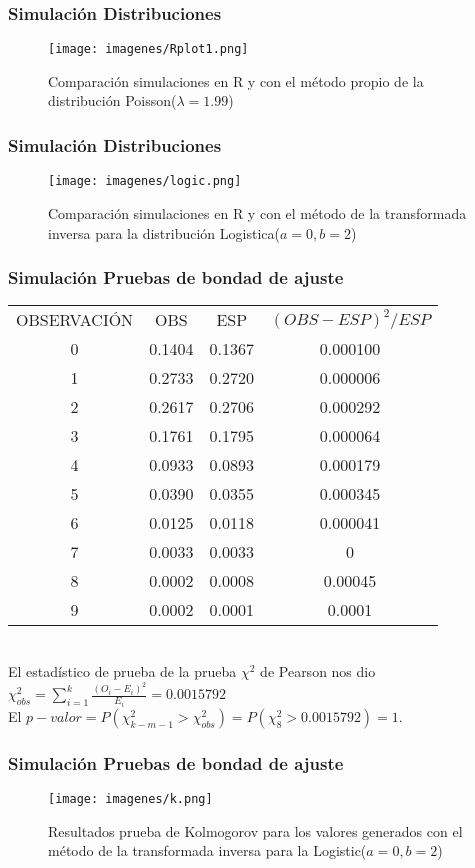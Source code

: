 \documentclass[12pt]{beamer}
\begin{document}
\begin{frame}
\frametitle{Simulación Distribuciones }
\begin{figure}
\centering
\texttt{[image: imagenes/Rplot1.png]}
\caption{Comparación simulaciones en R y con el método propio de la distribución Poisson($\lambda=1.99$)}\label{figura2}
\end{figure}
\end{frame}

\begin{frame}
\frametitle{Simulación Distribuciones}
\begin{figure}
\centering
\texttt{[image: imagenes/logic.png]}
\caption{Comparación simulaciones en R y con el método de la transformada inversa para la distribución Logistica($a=0,b=2$)}\label{figura2}
\end{figure}
\end{frame}

\begin{frame}
\frametitle{Simulación Pruebas de bondad de ajuste}
\begin{tabular}{cccc}
\hline 
OBSERVACIÓN & OBS & ESP & $(OBS-ESP)^2/ESP$ \\  
0 & 0.1404 & 0.1367 & 0.000100 \\  
1 & 0.2733 & 0.2720 & 0.000006 \\  
2 & 0.2617 & 0.2706 & 0.000292 \\  
3 & 0.1761 & 0.1795 & 0.000064 \\  
4 & 0.0933 & 0.0893 & 0.000179 \\ 
5 & 0.0390 & 0.0355 & 0.000345 \\  
6 & 0.0125 & 0.0118 & 0.000041 \\  
7 & 0.0033 & 0.0033 & 0 \\  
8 & 0.0002 & 0.0008 & 0.00045 \\  
9 & 0.0002 & 0.0001 & 0.0001 \\ 
\hline 
\end{tabular} 
~\\ El estadístico de prueba de la prueba $\chi^2$ de Pearson nos dio $\chi_{obs}^{2}=\sum\limits_{i=1}^{k}\frac{(O_{i}-E_{i})^2}{E_{i}}=0.0015792$  
~\\ El $p-valor=P(\chi^{2}_{k-m-1}>\chi^{2}_{obs})=P(\chi^{2}_{8}>0.0015792)=1$.
\end{frame}

\begin{frame}
\frametitle{Simulación Pruebas de bondad de ajuste}
\begin{figure}
  \centering
  \texttt{[image: imagenes/k.png]}
  \caption{Resultados prueba de Kolmogorov para los valores generados con el método de la transformada inversa para la Logistic($a=0,b=2$)}\label{figura1}
\end{figure}
\end{frame}
\end{document}
